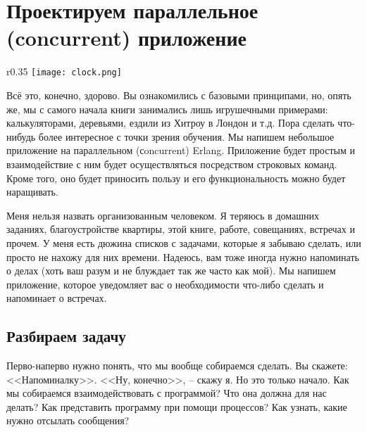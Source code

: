 \chapter{Проектируем параллельное (concurrent) приложение}
\label{designing-a-concurrent-application}
\begin{wrapfigure}{r}{0.35\linewidth}
    \texttt{[image: clock.png]}
\end{wrapfigure}
Всё это, конечно, здорово.
Вы ознакомились с базовыми принципами, но, опять же, мы с самого начала книги занимались лишь игрушечными примерами: калькуляторами, деревьями, ездили из Хитроу в Лондон и т.д.
Пора сделать что\--нибудь более интересное с точки зрения обучения.
Мы напишем небольшое приложение на параллельном (сoncurrent) Erlang.
Приложение будет простым и взаимодействие с ним будет осуществляться посредством строковых команд.
Кроме того, оно будет приносить пользу и его функциональность можно будет наращивать.

Меня нельзя назвать организованным человеком.
Я теряюсь в домашних заданиях, благоустройстве квартиры, этой книге, работе, совещаниях, встречах и прочем.
У меня есть дюжина списков с задачами, которые я забываю сделать, или просто не нахожу для них времени.
Надеюсь, вам тоже иногда нужно напоминать о делах (хоть ваш разум  и не блуждает так же часто как мой).
Мы напишем приложение, которое уведомляет вас о необходимости что\--либо сделать и напоминает о встречах.
\section{Разбираем задачу}
\label{understanding-the-problem}
Перво\--наперво нужно понять, что мы вообще собираемся сделать.
Вы скажете: <<Напоминалку>>.
<<Ну, конечно>>, \--- скажу я.
Но это только начало.
Как мы собираемся взаимодействовать с программой?
Что она должна для нас делать?
Как представить программу при помощи процессов?
Как узнать, какие нужно отсылать сообщения?


